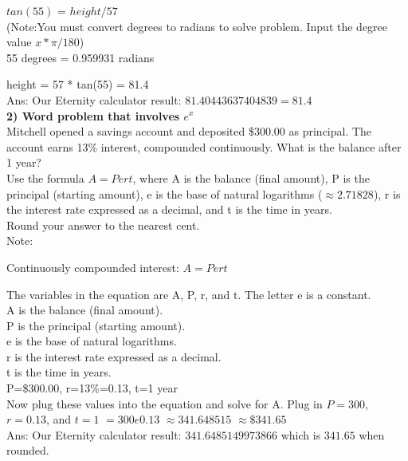 \documentclass[a4paper, 12pt]{article}
\begin{document}
$tan(55)$ = $height/57$ 
\\

(Note:You must convert degrees to radians to solve problem. Input the degree value $x * \pi / 180$)
\\

55 degrees = 0.959931 radians

height = 57 * tan(55) = 81.4
\\

Ans: Our Eternity calculator result: $81.40443637404839 = 81.4$
\\

\textbf{2) Word problem that involves $e^x$ }
\\

Mitchell opened a savings account and deposited \$300.00 as principal. The account earns 13\% interest, compounded continuously. What is the balance after 1 year?
\\

Use the formula $A = Pert$, where A is the balance (final amount), P is the principal (starting amount), e is the base of natural logarithms ($\approx2.71828$), r is the interest rate expressed as a decimal, and t is the time in years.
\\

Round your answer to the nearest cent.
\\

Note:

Continuously compounded interest:
$A=Pert$

The variables in the equation are A, P, r, and t. The letter e is a constant.\\

A is the balance (final amount).\\
P is the principal (starting amount).\\
e is the base of natural logarithms.\\
r is the interest rate expressed as a decimal.\\
t is the time in years.\\
P=\$300.00, r=13\%=0.13, t=1 year\\

Now plug these values into the equation and solve for A.
Plug in $P = 300$, $r = 0.13$, and $t=1$
$= 300e0.13$
$\approx 341.648515$
$\approx \$341.65$
\\

Ans: Our Eternity calculator result: $341.6485149973866$ which is $341.65$ when rounded.
\\
\end{document}
